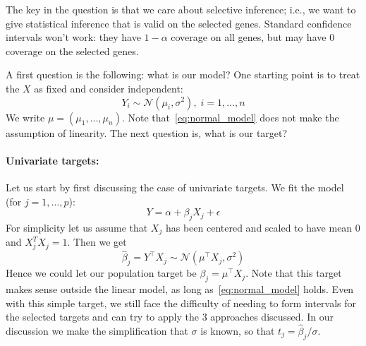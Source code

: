 	The key in the question is that we care about selective inference; i.e., we want to give statistical inference that is valid on the selected genes. Standard confidence intervals won't work: they have $1 - \alpha$ coverage on all genes, but may have 0 coverage on the selected genes.

	A first question is the following: what is our model? One starting point is to treat the $X$ as fixed and consider independent:
	\begin{equation}
	\label{eq:normal_model}
	Y_i \sim \mathcal{N}(\mu_i, \sigma^2), \; i=1,\dotsc,n
	\end{equation}
	We write $\mu = (\mu_1,\dotsc,\mu_n)$. Note that~\eqref{eq:normal_model} does not make the assumption of linearity. The next question is, what is our target?
	\paragraph{Univariate targets:} Let us start by first discussing the case of univariate targets. We fit the model (for $j=1,\dotsc,p$):
	\begin{equation}
	\label{eq:marginal_model}
	Y = \alpha + \beta_j X_j + \epsilon
	\end{equation}
	For simplicity let us assume that $X_j$ has been centered and scaled to have mean $0$ and $X_j^T X_j =1$. Then we get
	$$ \hat{\beta}_j =  Y^\top X_j  \sim \mathcal{N}( \mu^\top X_j,   \sigma^2)$$
	Hence we could let our population target be $\beta_j = \mu^\top X_j$. Note that this target makes sense outside the linear model, as long as~\eqref{eq:normal_model} holds. Even with this simple target, we still face the difficulty of needing to form intervals for the selected targets and can try to apply the 3 approaches discussed. In our discussion we make the simplification that $\sigma$ is known, so that $t_j = \hat{\beta}_j/\sigma$.



